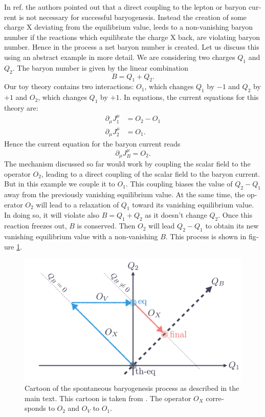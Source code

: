\documentclass[master,       %
               twoside,        %
               BCOR10mm,       %
               english,ngerman, %
               ]{GAUBM}
\begin{document}
\begin{otherlanguage}{english}
In ref. \cite{Domcke:2020kcp_Generic_Couplings} the authors pointed out that a direct coupling to the lepton or baryon current is not necessary for successful baryogenesis.
Instead the creation of some charge X deviating from the equilibrium value, leeds to a non-vanishing baryon number if the reactions which equilibrate the charge X back, are violating baryon number. Hence in the process a net baryon number is created.
Let us discuss this using an abstract example in more detail.
We are considering two charges $Q_1$ and $Q_2$. The baryon number is given by the linear combination
\begin{equation}
	B = Q_1 + Q_2.
\end{equation}
Our toy theory contains two interactions: $O_1$, which changes $Q_1$ by $-1$ and $Q_2$ by $+1$ and $O_2$, which changes $Q_1$ by $+1$. In equations, the current equations for this theory are:
\begin{align}
	\partial_\mu J_1^\mu &= O_2 - O_1 \\
	\partial_\mu J_2^\mu &= O_1 \nonumber.
\end{align}
Hence the current equation for the baryon current reads
\begin{equation}
	\partial_\mu J_B^\mu = O_2.
\end{equation}
The mechanism discussed so far would work by coupling the scalar field to the operator $O_2$, leading to a direct coupling of the scalar field to the baryon current. But in this example we couple it to $O_1$.
This coupling biases the value of $Q_2 - Q_1$ away from the previously vanishing equilibrium value.
At the same time, the operator $O_2$ will lead to a relaxation of $Q_1$ toward its vanishing equilibrium value. In doing so, it will violate also $B = Q_1 + Q_2$ as it doesn't change $Q_2$. Once this reaction freezes out, $B$ is conserved. Then $O_2$ will lead $Q_2 - Q_1$ to obtain its new vanishing equilibrium value with a non-vanishing $B$.
This process is shown in figure \ref{fig:sbg_cartoon}.
\begin{figure}[H]
	\centering
	\includegraphics[width=\linewidth]{figures/sbg_cartoon.pdf}
	\caption{Cartoon of the spontaneous baryogenesis process as described in the main text. This cartoon is taken from \cite[fig. 1]{Domcke:2020kcp_Generic_Couplings}.
	The operator $O_X$ corresponds to $O_2$ and $O_V$ to $O_1$.
	}
	\label{fig:sbg_cartoon}
\end{figure}


\end{otherlanguage}
\end{document}
